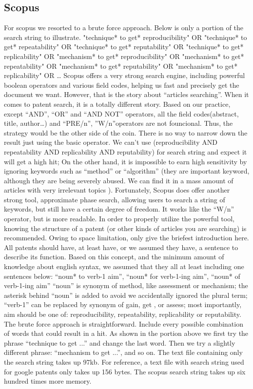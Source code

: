 \documentclass[
10pt, %
a4paper, %
oneside, %
headinclude,footinclude, %
BCOR5mm, %
]{scrartcl}
\begin{document}
\subsection{Scopus}
For scopus we resorted to a brute force approach. Below is only a portion of the search string to illustrate.
"technique* to get* reproducibility" OR "technique* to get* repeatability" OR "technique* to get* reputability" OR "technique* to get* replicability" OR 
"mechanism* to get* reproducibility" OR "mechanism* to get* repeatability" OR "mechanism* to get* reputability" OR "mechanism* to get* replicability" OR …
Scopus offers a very strong search engine, including powerful boolean operators and various field codes, helping us fast and precisely get the document we want. However, that is the story about “articles searching”. When it comes to patent search, it is a totally different story. Based on our practice, except “AND”, “OR” and “AND NOT” operators, all the field codes(abstract, title, author…) and “PRE/n”, ”W/n”operators are not founcional. Thus, the strategy would be the other side of the coin. 
There is no way to narrow down the result just using the basic operator. We can’t use (reproducibility AND repeatability AND replicability AND reputability) for search string and expect it will get a high hit; On the other hand, it is impossible to earn high sensitivity by ignoring keywords such as “method” or “algorithm” (they are important keyword, although they are being severely abused. We can find it in a mass amount of articles with very irrelevant topics ). 
Fortunately, Scopus does offer another strong tool, approximate phase search, allowing users to search a string of keywords, but still have a certain degree of freedom. It works like the “W/n” operator, but is more readable.
In order to properly utilize the powerful tool, knowing the structure of a patent (or other kinds of articles you are searching) is recommended. Owing to space limitation, only give the briefest introduction here. All patents should have, at least have, or we assumed they have, a sentence to describe its function. Based on this concept, and the minimum amount of knowledge about english syntax, we assumed that they all at least including one sentences below:
“noun* to verb-1 aim”, “noun* for verb-1-ing aim”, “noun* of verb-1-ing aim”
“noun” is synonym of method, like assessment or mechanism; the asterisk behind “noun” is added to avoid we accidentally ignored the plural term; “verb-1” can be replaced by synonym of gain, get , or assess; most importantly, aim should be one of: reproducibility, repeatability, replicability or reputability.
The brute force approach is straightforward. Include every possible combination of words that could result in a hit. As shown in the portion above we first try the phrase “technique to get ...” and change the last word. Then we try a slightly different phrase: “mechanism to get ...”, and so on. The text file containing only the search string takes up 97kb. For reference, a text file with search string used for google patents only takes up 156 bytes. The scopus search string takes up six hundred times more memory.  
\end{document}
